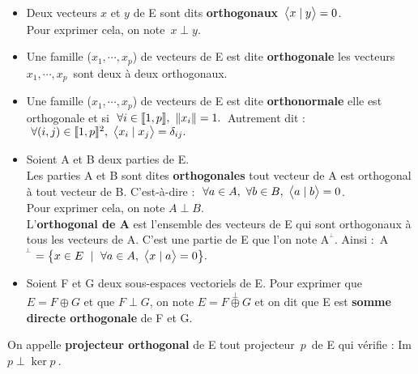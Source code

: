 \begin{itemize}[leftmargin=1cm, label=•]
    \item Deux vecteurs $x$ et $y$ de E sont dits \textbf{orthogonaux} \ssi \(\,\bigl\langle x\mid y \bigr\rangle=0\).\\
    Pour exprimer cela, on note \(\,x\perp y\).\vspace{0.2cm}

    \item Une famille (\(x_1,\cdots,x_p\)) de vecteurs de E est dite \textbf{orthogonale} \ssi les vecteurs \(x_1,\cdots,x_p\,\) sont deux à deux orthogonaux.\vspace{0.2cm}

    \item Une famille (\(x_1,\cdots,x_p\)) de vecteurs de E est dite \textbf{orthonormale} \ssi elle est orthogonale et si \(\ \forall i\in \llbracket1,p\rrbracket,\ \left\lVert x_i\right\rVert=1.\,\) Autrement dit : \(\ \forall (i,j)\in \llbracket 1,p\rrbracket^2,\ \psm{x_i}{x_j}=\delta_{ij}.\)\vspace{0.2cm}

    \item Soient A et B deux parties de E.\\
    Les parties A et B sont dites \textbf{orthogonales} \ssi tout vecteur de A est orthogonal à tout vecteur de B. C'est-à-dire \ssi : \(\ \forall a\in A,\ \forall b\in B,\ \psm{a}{b}=0 \).\\
    Pour exprimer cela, on note \(A\perp B\).\vspace{0.15cm}\\
    L'\textbf{orthogonal de A} est l'ensemble des vecteurs de E qui sont orthogonaux à tous les vecteurs de A. C'est une partie de E que l'on note A\(\!^{^\perp}\). Ainsi : \,A\(\!^{^\perp}  =\bigl\{x\in E \ \mid \ \forall a\in A,\ \bigl\langle x\mid a \bigr\rangle=0 \bigr\}. \)\vspace{0.3cm}

    \item Soient F et G deux sous-espaces vectoriels de E. Pour exprimer que \(E=F\oplus G\) et que \(F\perp G\), on note \(E=F\overset{\perp}{\oplus}G \) et on dit que E est \textbf{somme directe orthogonale} de F et G.
\end{itemize}

\vspace{1cm}

\noindent On appelle \textbf{projecteur orthogonal} de E tout projecteur \(\,p\,\) de E qui vérifie : Im \(\! p \perp \ker p\ \).

